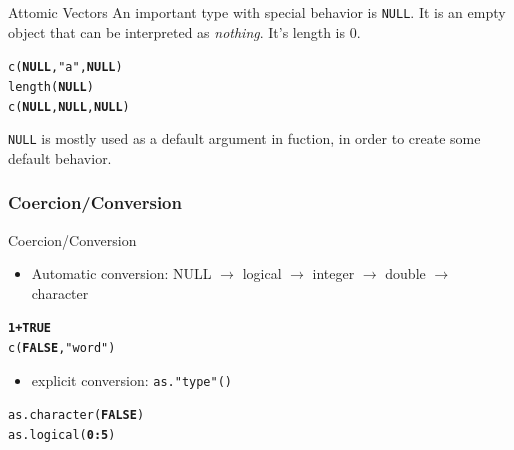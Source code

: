 \documentclass{beamer}\usepackage[]{graphicx}\usepackage[]{color}
\makeatletter
\newcommand{\hlnum}[1]{\textcolor[rgb]{0.502,0,0.502}{\textbf{#1}}}%
\newcommand{\hlstr}[1]{\textcolor[rgb]{0.651,0.522,0}{#1}}%
\newcommand{\hlopt}[1]{\textcolor[rgb]{1,0,0.502}{\textbf{#1}}}%
\newcommand{\hlstd}[1]{\textcolor[rgb]{0,0,0}{#1}}%
\newcommand{\hlkwa}[1]{\textcolor[rgb]{0.733,0.475,0.467}{\textbf{#1}}}%
\newcommand{\hlkwd}[1]{\textcolor[rgb]{0,0.267,0.4}{#1}}%
\newenvironment{kframe}{%
 \def\at@end@of@kframe{}%
 \ifinner\ifhmode%
  \def\at@end@of@kframe{\end{minipage}}%
  \begin{minipage}{\columnwidth}%
 \fi\fi%
 \def\FrameCommand##1{\hskip\@totalleftmargin \hskip-\fboxsep
 \colorbox{shadecolor}{##1}\hskip-\fboxsep
     \hskip-\linewidth \hskip-\@totalleftmargin \hskip\columnwidth}%
 \MakeFramed {\advance\hsize-\width
   \@totalleftmargin\z@ \linewidth\hsize
   \@setminipage}}%
 {\par\unskip\endMakeFramed%
 \at@end@of@kframe}
\newenvironment{knitrout}{}{} %
\makeatother
\begin{document}
\begin{frame}[fragile]{Attomic Vectors}
An important type with special behavior is \texttt{NULL}. It is an empty object that can be interpreted as \emph{nothing}. It's length is 0.

\begin{knitrout}
\color{fgcolor}\begin{kframe}
\begin{alltt}
\hlkwd{c}\hlstd{(}\hlkwa{NULL}\hlstd{,} \hlstr{"a"}\hlstd{,} \hlkwa{NULL}\hlstd{)}
\hlkwd{length}\hlstd{(}\hlkwa{NULL}\hlstd{)}
\hlkwd{c}\hlstd{(}\hlkwa{NULL}\hlstd{,} \hlkwa{NULL}\hlstd{,} \hlkwa{NULL}\hlstd{)}
\end{alltt}
\end{kframe}
\end{knitrout}

\texttt{NULL} is mostly used as a default argument in fuction, in order to create some default behavior.

\end{frame}


\subsubsection{Coercion/Conversion}


\begin{frame}[fragile]{Coercion/Conversion}

	\begin{itemize}
			\item Automatic conversion:
			NULL $\rightarrow$ logical $\rightarrow$ integer $\rightarrow$ double $\rightarrow$ character
      \end{itemize}

\begin{knitrout}
\color{fgcolor}\begin{kframe}
\begin{alltt}
\hlnum{1} \hlopt{+} \hlnum{TRUE}
\hlkwd{c}\hlstd{(}\hlnum{FALSE}\hlstd{,} \hlstr{"word"}\hlstd{)}
\end{alltt}
\end{kframe}
\end{knitrout}

	\begin{itemize}		
			\item explicit conversion: \texttt{as."type"()}
	\end{itemize}
			
\begin{knitrout}
\color{fgcolor}\begin{kframe}
\begin{alltt}
\hlkwd{as.character}\hlstd{(}\hlnum{FALSE}\hlstd{)}
\hlkwd{as.logical}\hlstd{(}\hlnum{0}\hlopt{:}\hlnum{5}\hlstd{)}
\end{alltt}
\end{kframe}
\end{knitrout}

\end{frame}
\end{document}

